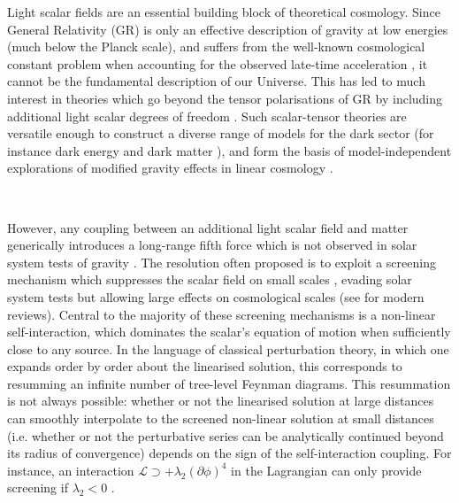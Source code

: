 \documentclass[11pt]{article}
\begin{document}
Light scalar fields are an essential building block of theoretical cosmology.
Since General Relativity (GR) is only an effective description of gravity at low energies (much below the Planck scale), and suffers from the well-known cosmological constant problem \cite{Weinberg:1988cp} when accounting for the observed late-time acceleration \cite{Riess:1998cb, Perlmutter:1998np}, it cannot be the fundamental description of our Universe.
This has led to much interest in theories which go beyond the tensor polarisations of GR by including additional light scalar degrees of freedom \cite{Capozziello:2007ec, Capozziello:2011et, Clifton:2011jh, Joyce:2014kja, Bull:2015stt, Koyama:2015vza}. Such scalar-tensor theories are versatile enough to construct a diverse range of models for the dark sector (for instance dark energy \cite{Chiba:1999ka, ArmendarizPicon:2000dh, ArmendarizPicon:2000ah, Boisseau:2000pr, Copeland:2006wr, Bamba:2012cp} and dark matter \cite{Sin:1992bg, Hu:2000ke, Burgess:2000yq, Bekenstein:2004ne}), and form the basis of model-independent explorations of modified gravity effects in linear cosmology \cite{Gubitosi:2012hu,Bloomfield:2012ff,Gleyzes:2014rba,Bellini:2014fua}.

~
 
However, any coupling between an additional light scalar field and matter generically introduces a long-range fifth force which is not observed in solar system tests of gravity \cite{Will:2001mx, Bertotti:2003rm, Williams:2004qba}. 
The resolution often proposed is to exploit a screening mechanism which suppresses the scalar field on small scales \cite{Vainshtein:1972sx, Damour:1994zq, Khoury:2003aq, Khoury:2003rn, Brax:2004qh, Nicolis:2008in, Babichev:2009ee, Khoury:2010xi}, evading solar system tests but allowing large effects on cosmological scales (see \cite{Burrage:2016bwy,Burrage:2017qrf, Sakstein:2018fwz,Baker:2019gxo} for modern reviews).  
Central to the majority of these screening mechanisms is a non-linear self-interaction, which dominates the scalar's equation of motion when sufficiently close to any source. 
In the language of classical perturbation theory, in which one expands order by order about the linearised solution, this corresponds to resumming an infinite number of tree-level Feynman diagrams. 
This resummation is not always possible: whether or not the linearised solution at large distances can smoothly interpolate to the screened non-linear solution at small distances (i.e. whether or not the perturbative series can be analytically continued beyond its radius of convergence) depends on the sign of the self-interaction coupling. For instance, an interaction $\mathcal{L} \supset + \lambda_2 (\partial \phi)^{4}$ in the Lagrangian can only provide screening if $\lambda_2 < 0$ \cite{Dvali:2012zc, Brax:2014gra}. 
\end{document}
